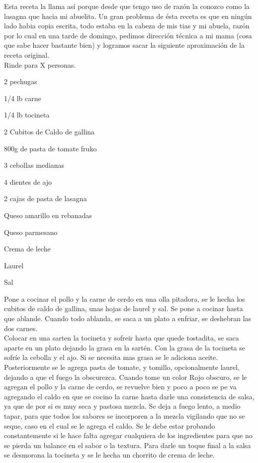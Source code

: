Esta receta la llama así porque desde que tengo uso de razón la conozco como la lasagna que hacia mi abuelita. Un gran problema de ésta receta es que en ningún lado habia copia escrita, todo estaba en la cabeza de mis tias y mi abuela, razón por lo cual en una tarde de domingo, pedimos dirección técnica a mi mama (cosa que sabe hacer bastante bien) y logramos sacar la siguiente aproximación de la receta original. \\

Rinde para X personas.

\begin{ingredientes}
\item 2 pechugas
\item 1/4 lb carne
\item 1/4 lb tocineta
\item 2 Cubitos de Caldo de gallina
\item 800g de pasta de tomate fruko
\item 3 cebollas medianas
\item 4 dientes de ajo
\item 2 cajas de pasta de lasagna
\item Queso amarillo en rebanadas
\item Queso parmesano
\item Crema de leche
\item Laurel
\item Sal
\end{ingredientes}
\preparacion
Pone a cocinar el pollo y la carne de cerdo en una olla pitadora, se le hecha los cubitos de caldo de gallina, unas hojas de laurel y sal. Se pone a cocinar hasta que ablande. Cuando todo ablanda, se saca a un plato a enfriar, se deshebran las dos carnes.\\

Colocar en una sarten la tocineta y sofreir hasta que quede tostadita, se saca aparte en un plato dejando la grasa en la sartén. Con la grasa de la tocineta se sofríe la cebolla y el ajo. Si se necesita mas grasa se le adiciona aceite. Posteriormente se le agrega pasta de tomate, y tomillo, opcionalmente laurel, dejando a que el fuego la obscurezca. Cuando tome un color Rojo obscuro, se le agregan el pollo y la carne de cerdo, se revuelve bien y poco a poco se pe va agregando el caldo en que se cocino la carne hasta darle una consistencia de salsa, ya que de por si es muy seca y pastosa mezcla. Se deja a fuego lento, a medio tapar, para que todos los sabores se incorporen a la mezcla vigilando que no se seque, caso en el cual se le agrega el caldo. Se le debe estar probando constantemente si le hace falta agregar cualquiera de los ingredientes para que no se pierda un balance en el sabor o la textura. Para darle un toque final a la salsa se desmorona la tocineta y se le hecha un chorrito de crema de leche.\\

